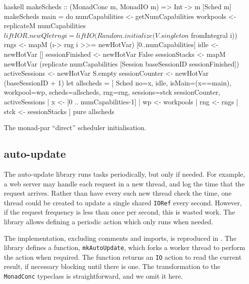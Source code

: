 \begin{listing}
  \begin{sublisting}{\textwidth}
    \centering
    \begin{cminted}{haskell}
makeScheds :: (MonadConc m, MonadIO m) => Int -> m [Sched m]
makeScheds main = do
   numCapabilities <- getNumCapabilities
   workpools <- replicateM numCapabilities $ liftIO R.newQ
   let rng i = liftIO (Random.initialize (V.singleton $ fromIntegral i))
   rngs <- mapM (\i -> rng i >>= newHotVar) [0..numCapabilities]
   idle <- newHotVar []
   sessionFinished <- newHotVar False
   sessionStacks   <- mapM newHotVar
     (replicate numCapabilities [Session baseSessionID sessionFinished])
   activeSessions  <- newHotVar S.empty
   sessionCounter  <- newHotVar (baseSessionID + 1)
   let allscheds = [ Sched { no=x, idle, isMain=(x==main), workpool=wp,
                             scheds=allscheds, rng=rng, sessions=stck
                             sessionCounter, activeSessions
                           }
                   | x   <- [0 .. numCapabilities-1]
                   | wp  <- workpools
                   | rng <- rngs
                   | stck <- sessionStacks
                   ]
   pure allscheds
    \end{cminted}
    \caption{\dejafu{}}\label{lst:parmonad_dejafu}
  \end{sublisting}
  \caption{The monad-par ``direct'' scheduler initialisation.}\label{lst:parmonad}
\end{listing}

\subsection{auto-update}

The auto-update library \parencite{auto_update} runs tasks periodically, but
only if needed.  For example, a web server may handle each request in
a new thread, and log the time that the request arrives.  Rather than
have every such new thread check the time, one thread could be created
to update a single shared \verb|IORef| every second.  However, if the
request frequency is less than once per second, this is wasted work.
The library allows defining a periodic action which only runs when
needed.

The implementation, excluding comments and imports, is reproduced in
.  The library defines a function,
\verb|mkAutoUpdate|, which forks a worker thread to perform the action
when required.  The function returns an \verb|IO| action to read the
current result, if necessary blocking until there is one.  The
transformation to the \verb|MonadConc| typeclass is straightforward,
and we omit it here.

